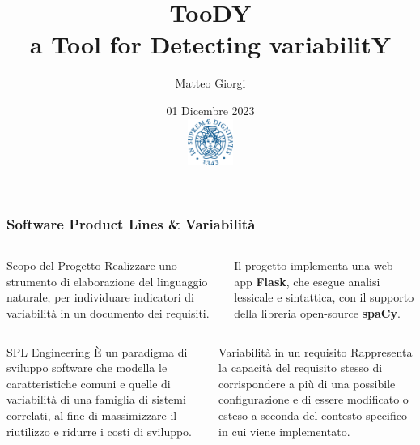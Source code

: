 \documentclass{beamer}
\title{
    {\Huge TooDY}\\
    {\small a Tool for Detecting variabilitY}}
\author{
    Matteo Giorgi
    \vspace{3mm}
}
\institute{
    Università degli Studi di Pisa
    \vspace{-3mm}
}
\date{
    \tiny 01 Dicembre 2023\\
    \vspace{5mm}
    \includegraphics[width=1.5cm]{cherubino.png}
}
\begin{document}


\begin{frame}
\titlepage
\end{frame}


\begin{frame}
\frametitle{Software Product Lines \& Variabilità}

\begin{columns}
\begin{alertblock}{Scopo del Progetto}
Realizzare uno strumento di elaborazione del linguaggio naturale, per individuare indicatori di variabilità in un documento dei requisiti.
\end{alertblock}
Il progetto implementa una web-app \textbf{Flask}, che esegue analisi lessicale e sintattica, con il supporto della libreria open-source \textbf{spaCy}.
\end{columns}

\begin{columns}
\begin{block}{SPL Engineering}
È un paradigma di sviluppo software che modella le caratteristiche comuni e quelle di variabilità di una famiglia di sistemi correlati, al fine di massimizzare il riutilizzo e ridurre i costi di sviluppo.
\end{block}
\begin{block}{Variabilità in un requisito}
Rappresenta la capacità del requisito stesso di corrispondere a più di una possibile configurazione e di essere modificato o esteso a seconda del contesto specifico in cui viene implementato.
\end{block}
\end{columns}
\end{frame}
\end{document}
